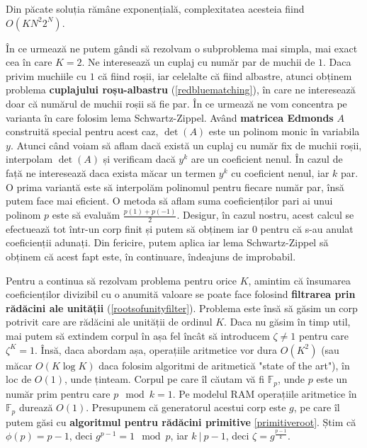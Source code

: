 \noindent Din păcate soluția rămâne exponențială, complexitatea acesteia fiind $O(KN^{2}2^{N})$.

\pagebreak

În ce urmează ne putem gândi să rezolvam o subproblema mai simpla, mai exact cea în care $K=2$.
Ne interesează un cuplaj cu număr par de muchii de $1$. Daca privim muchiile cu $1$ că fiind
roșii, iar celelalte că fiind albastre, atunci obținem problema \textbf{cuplajului roșu-albastru} (\ref{redbluematching}),
în care ne interesează doar că numărul de muchii roșii să fie par. În ce urmează ne vom concentra pe varianta
în care folosim lema Schwartz-Zippel. Având \textbf{matricea Edmonds} $A$ construită special pentru acest caz,
$\det(A)$ este un polinom monic în variabila $y$. Atunci când voiam să aflam dacă există un cuplaj cu număr
fix de muchii roșii, interpolam $\det(A)$ și verificam dacă $y^{k}$ are un coeficient nenul. În cazul de față
ne interesează daca exista măcar un termen $y^{k}$ cu coeficient nenul, iar $k$ par. O prima variantă este să
interpolăm polinomul pentru fiecare număr par, însă putem face mai eficient. O metoda să aflam suma coeficienților
pari ai unui polinom $p$ este să evaluăm $\frac{p(1) + p(-1)}{2}$. Desigur, în cazul nostru, acest calcul se
efectuează tot într-un corp finit și putem să obținem iar $0$ pentru că s-au anulat coeficienții adunați.
Din fericire, putem aplica iar lema Schwartz-Zippel să obținem că acest fapt este, în continuare, îndeajuns
de improbabil.

Pentru a continua să rezolvam problema pentru orice $K$, amintim că însumarea coeficienților divizibil cu o anumită valoare
se poate face folosind \textbf{filtrarea prin rădăcini ale unității} (\ref{rootsofunityfilter}). Problema este însă
să găsim un corp potrivit care are rădăcini ale unității de ordinul $K$. Daca nu găsim în timp util, mai putem să extindem
corpul în așa fel încât să introducem $\zeta \neq 1$ pentru care $\zeta^{K} = 1$. Însă, daca abordam așa, operațiile
aritmetice vor dura $O(K^{2})$ (sau măcar $O(K \log K)$ daca folosim algoritmi de aritmetică "state of the art"),
în loc de $O(1)$, unde ținteam. Corpul pe care îl căutam vă fi $\mathbb{F}_{p}$, unde $p$ este un număr prim pentru care
$p \mod k = 1$. Pe modelul RAM operațiile aritmetice în $\mathbb{F}_{p}$ durează $O(1)$. Presupunem că generatorul acestui
corp este $g$, pe care îl putem găsi cu \textbf{algoritmul pentru rădăcini primitive} \ref{primitiveroot}. Știm că
$\phi(p) = p - 1$, deci $g^{p - 1} = 1 \mod p$, iar $k\ |\ p - 1$, deci $\zeta = g^{\frac{p-1}{k}}$.


